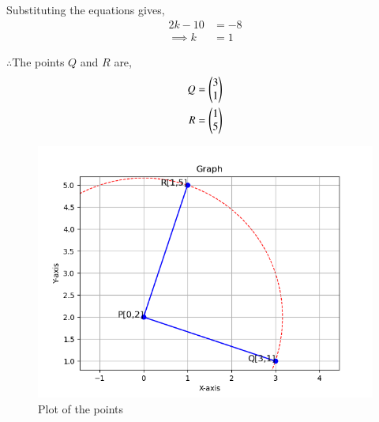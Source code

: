 \documentclass[journal]{IEEEtran}
\begin{document}
Substituting the equations gives,
\begin{align}
    2k-10&=-8\label{eq1.1.9.23.11}\\
    \implies k&=1\label{eq1.1.9.23.12}
\end{align}

$\therefore$The points $Q$ and $R$ are,
\begin{align}
    Q&=\begin{pmatrix}3\\1\\\end{pmatrix}\label{eq1.1.9.23.13}\\
    R&=\begin{pmatrix}1\\5\\\end{pmatrix}\label{eq1.1.9.23.14}
\end{align}


\begin{figure}[h!]
\renewcommand{\thefigure}{1}
    \centering
    \includegraphics[width=0.7\linewidth]{figs/plot.png}
    \caption{Plot of the points}
    \label{fig1.1.5.10.1}
\end{figure}
\end{document}
